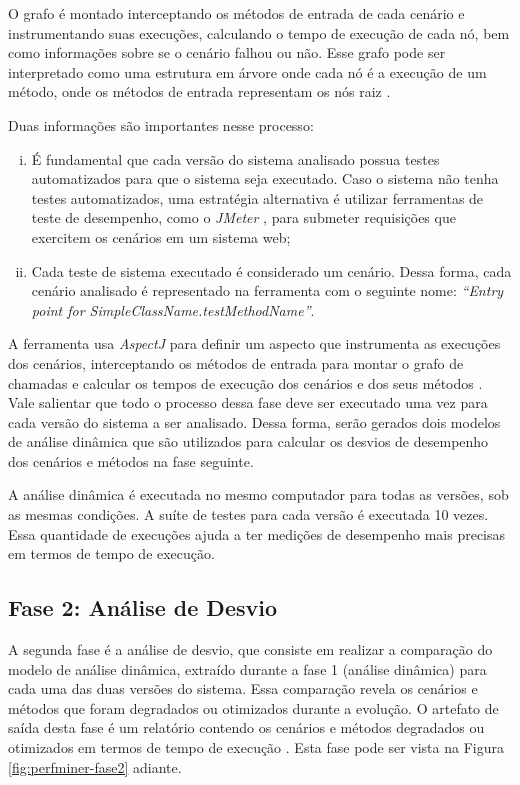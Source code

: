 O grafo é montado interceptando os métodos de entrada de cada cenário e instrumentando suas execuções, calculando o tempo de execução de cada nó, bem como informações sobre se o cenário falhou ou não. Esse grafo pode ser interpretado como uma estrutura em árvore onde cada nó é a execução de um método, onde os métodos de entrada representam os nós raiz \cite{Pinto2015}.

Duas informações são importantes nesse processo:
\begin{enumerate}[(i)]
   \item É fundamental que cada versão do sistema analisado possua testes automatizados para que o sistema seja executado. Caso o sistema não tenha testes automatizados, uma estratégia alternativa é utilizar ferramentas de teste de desempenho, como o \textit{JMeter} \cite{ApacheJMeter2016}, para submeter requisições que exercitem os cenários em um sistema web;
   \item Cada teste de sistema executado é considerado um cenário. Dessa forma, cada cenário analisado é representado na ferramenta com o seguinte nome: \textit{``Entry point for SimpleClassName.testMethodName''}.
\end{enumerate}

A ferramenta usa \textit{AspectJ} para definir um aspecto que instrumenta as execuções dos cenários, interceptando os métodos de entrada para montar o grafo de chamadas e calcular os tempos de execução dos cenários e dos seus métodos \cite{Pinto2015}. Vale salientar que todo o processo dessa fase deve ser executado uma vez para cada versão do sistema a ser analisado. Dessa forma, serão gerados dois modelos de análise dinâmica que são utilizados para calcular os desvios de desempenho dos cenários e métodos na fase seguinte.

A análise dinâmica é executada no mesmo computador para todas as versões, sob as mesmas condições. A suíte de testes para cada versão é executada 10 vezes. Essa quantidade de execuções ajuda a ter medições de desempenho mais precisas em termos de tempo de execução.

\subsection{Fase 2: Análise de Desvio} \label{subsec:fase2}

A segunda fase é a análise de desvio, que consiste em realizar a comparação do modelo de análise dinâmica, extraído durante a fase 1 (análise dinâmica) para cada uma das duas versões do sistema. Essa comparação revela os cenários e métodos que foram degradados ou otimizados durante a evolução. O artefato de saída desta fase é um relatório contendo os cenários e métodos degradados ou otimizados em termos de tempo de execução \cite{Pinto2015}. Esta fase pode ser vista na Figura \ref{fig:perfminer-fase2} adiante.

